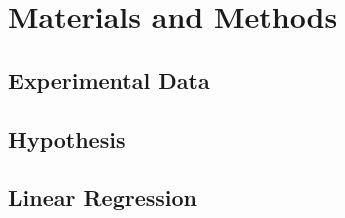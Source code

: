\section{Materials and Methods}

\subsection{Experimental Data}

\subsection{Hypothesis}

\subsection{Linear Regression}